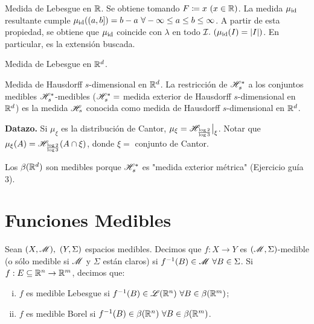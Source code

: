 
\begin{eg}
	Medida de Lebesgue en $\mathbb{R}$. Se obtiene tomando $F \coloneq x \ (x \in \mathbb{R})$. La medida $\mu_{\operatorname{id}}$ resultante cumple $\mu_{\id}((a,b]) = b-a \ \forall -\infty \leq a \leq b \leq \infty$. A partir de esta propiedad, se obtiene que $\mu_{\operatorname{id}}$ coincide con $\lambda$ en todo $\mathcal{I}.\ (\mu_{\operatorname{id}}(I) = |I|)$. En particular, es la extensión buscada.
\end{eg}

\begin{eg}[¿?]
	Medida de Lebesgue en $\mathbb{R}^d$.
\end{eg}

\begin{eg}
	Medida de Hausdorff $s$-dimensional en $\mathbb{R}^d$. La restricción de $\mathscr{H}_{s}^{*}$ a los conjuntos medibles $\mathscr{H}_{s}^{*}$-medibles ($\mathscr{H}_{s}^{*} =$ medida exterior de Hausdorff $s$-dimensional en $\mathbb{R}^d$) es la medida $\mathscr{H}_{s}$ conocida como medida de Hausdorff $s$-dimensional en $\mathbb{R}^d$.
\end{eg}

\noindent \textbf{Datazo.} Si $\mu_{\xi}$ es la distribución de Cantor, $\mu_{\xi} = \mathscr{H}_{\frac{\log 2}{\log 3}} \big|_{\xi}$. Notar que $\mu_{\xi}(A) = \mathscr{H}_{\frac{\log 2}{\log 3}} (A \cap \xi)$, donde $\xi =$ conjunto de Cantor.

\begin{remark}
	Los $\beta(\mathbb{R}^d)$ son medibles porque $\mathscr{H}_{s}^{*}$ es "medida exterior métrica" (Ejercicio guía 3).
\end{remark}

\chapter{Funciones Medibles}

\begin{definition}
	Sean $(X, \mathscr{M}),\ (Y, \Sigma)$ espacios medibles. Decimos que $f : X \to Y$ es $(\mathscr{M}, \Sigma)$-medible (o sólo medible si $\mathscr{M}$ y $\Sigma$ están claros) si $f^{-1}(B) \in \mscr{M} \ \forall B \in \Sigma$. Si $f : E \subseteq \mathbb{R}^n \to \mathbb{R}^m$, decimos que:
	\begin{enumerate}[i.]
		\item $f$ es medible Lebesgue si $f^{-1}(B) \in \mathscr{L}(\mathbb{R}^n) \ \forall B \in \beta(\mathbb{R}^m)$;

		\item $f$ es medible Borel si $f^{-1}(B) \in \beta(\mathbb{R}^n) \ \forall B \in \beta(\mathbb{R}^m)$.
	\end{enumerate}
\end{definition}

